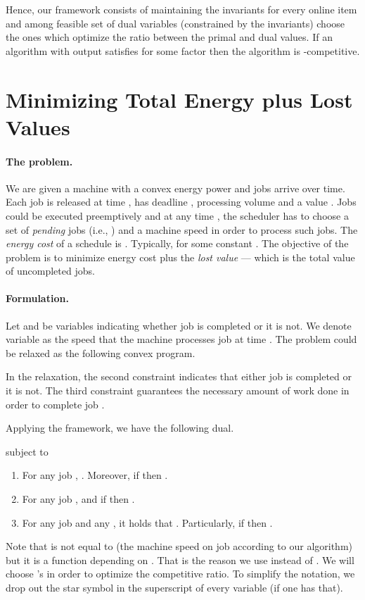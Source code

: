 \documentclass[11pt]{article}
\begin{document}
Hence, our framework consists of maintaining the invariants for every online item  and
among feasible set of dual variables (constrained by the invariants) choose the ones 
which optimize the ratio between the primal and dual values. If an algorithm with output 
 satisfies  for some factor  then 
the algorithm is -competitive.

\section{Minimizing Total Energy plus Lost Values}	\label{sec:energy+values}

\paragraph{The problem.}
We are given a machine with a convex energy power  and
jobs arrive over time. Each job  is released at time , has deadline , processing volume 
 and a value . Jobs could be executed preemptively and at any time , the scheduler 
has to choose a set of \emph{pending} jobs (i.e., ) and a machine speed  
in order to process such jobs. The \emph{energy cost} of a schedule is 
. Typically,
 for some constant . The objective of the problem
is to minimize energy cost plus the \emph{lost value} --- which is the total value of uncompleted jobs.


\paragraph{Formulation.} Let  and  be variables indicating whether job  is completed or it is not.
We denote variable  as the speed that the machine processes job  at time .  
The problem could be relaxed as the following convex program.
 
  
In the relaxation, the second constraint indicates that either job  is completed or it is not. 
The third constraint guarantees the necessary amount of work done in order to complete job .  

Applying the framework, we have the following dual.

subject to
\begin{enumerate}
	\item For any job , . 
	Moreover,  if  then . 
	\item For any job ,  and  if  then .
	\item For any job  and any , it holds that 
	. 
	Particularly, if  then . 
\end{enumerate}
Note that  is not equal to  (the machine speed on job  according to our algorithm) 
but it is a function depending on . That is the reason we use  instead of .
We will choose 's in order to optimize the competitive ratio. To simplify the notation, we drop out 
the star symbol in the superscript of every variable (if one has that). 
\end{document}
